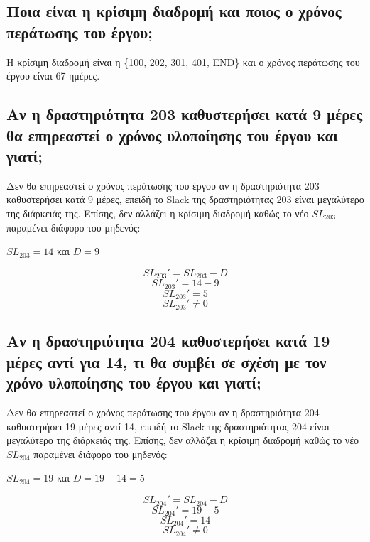 \documentclass[12pt]{turabian-researchpaper}
\begin{document}
\newpage
\subsection{Ποια είναι η κρίσιμη διαδρομή και ποιος ο χρόνος περάτωσης του έργου;}
\begin{figure}
    \centering
    \def\svgwidth{\columnwidth}
    
\end{figure}
Η κρίσιμη διαδρομή είναι η \{100, 202, 301, 401, END\} και ο χρόνος περάτωσης του έργου είναι 67 ημέρες.

\subsection{Αν η δραστηριότητα 203 καθυστερήσει κατά 9 μέρες θα επηρεαστεί ο χρόνος υλοποίησης του έργου και γιατί;}
Δεν θα επηρεαστεί ο χρόνος περάτωσης του έργου αν η δραστηριότητα 203 καθυστερήσει κατά 9 μέρες, επειδή το Slack της δραστηριότητας 203 είναι μεγαλύτερο της διάρκειάς της. Επίσης, δεν αλλάζει η κρίσιμη διαδρομή καθώς το νέο $SL_{203}$ παραμένει διάφορο του μηδενός:
\begin{center}
    $ SL_{203} = 14 $ και $ D = 9 $
\end{center}
$$ SL_{203}' = SL_{203} - D $$
$$ SL_{203}' = 14 - 9 $$
$$ SL_{203}' = 5 $$
$$ SL_{203}' \neq 0 $$

\subsection{Αν η δραστηριότητα 204 καθυστερήσει κατά 19 μέρες αντί για 14, τι θα συμβέι σε σχέση με τον χρόνο υλοποίησης του έργου και γιατί;}
Δεν θα επηρεαστεί ο χρόνος περάτωσης του έργου αν η δραστηριότητα 204 καθυστερήσει 19 μέρες αντί 14, επειδή το Slack της δραστηριότητας 204 είναι μεγαλύτερο της διάρκειάς της. Επίσης, δεν αλλάζει η κρίσιμη διαδρομή καθώς το νέο $SL_{204}$ παραμένει διάφορο του μηδενός:
\begin{center}
    $ SL_{204} = 19 $ και $ D = 19 - 14 = 5 $
\end{center}
$$ SL_{204}' = SL_{204} - D $$
$$ SL_{204}' = 19 - 5 $$
$$ SL_{204}' = 14 $$
$$ SL_{204}' \neq 0 $$

\newpage
\end{document}

